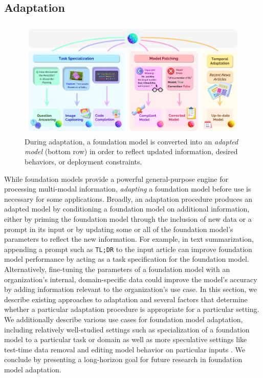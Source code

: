 \newsection
\subsection{Adaptation}
\label{sec:adaptation}

\begin{figure}[!ht]
\centering
\includegraphics[width=\linewidth]{technology/figures/Adaptation.png}
\caption{\label{fig:adaptation} During adaptation, a foundation model is converted into an \textit{adapted model} (bottom row) in order to reflect updated information, desired behaviors, or deployment constraints.}
\end{figure}

\noindent While foundation models provide a powerful general-purpose engine for processing multi-modal information, \textit{adapting} a foundation model before use is necessary for some applications. Broadly, an adaptation procedure produces an adapted model by conditioning a foundation model on additional information, either by priming the foundation model through the inclusion of new data or a prompt in its input or by updating some or all of the foundation model's parameters to reflect the new information. For example, in text summarization, appending a prompt such as \texttt{TL;DR} to the input article can improve foundation model performance  \citep{radford2019language} by acting as a task specification for the foundation model. Alternatively, fine-tuning the parameters of a foundation model with an organization's internal, domain-specific data could improve the model's accuracy by adding information relevant to the organization’s use case. In this section, we describe existing approaches to adaptation and several factors that determine whether a particular adaptation procedure is appropriate for a particular setting. We additionally describe various use cases for foundation model adaptation, including relatively well-studied settings such as specialization of a foundation model to a particular task or domain as well as more speculative settings like test-time data removal \citep{bourtoule2019machine} and editing model behavior on particular inputs \citep{sinitsin2020editable}. We conclude by presenting a long-horizon goal for future research in foundation model adaptation.
